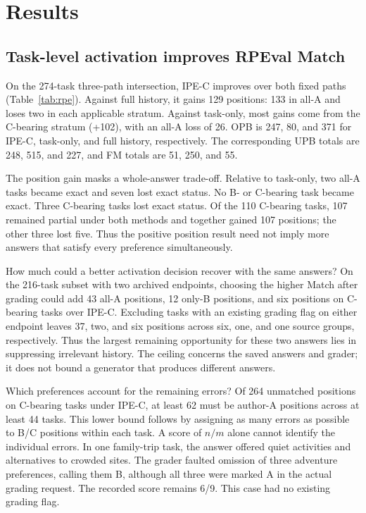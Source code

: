 \documentclass[11pt]{article}
\begin{document}
\section{Results}

\subsection{Task-level activation improves RPEval Match}

On the 274-task three-path intersection, IPE-C improves over both fixed paths (Table~\ref{tab:rpe}). Against full history, it gains 129 positions: 133 in all-A and loses two in each applicable stratum. Against task-only, most gains come from the C-bearing stratum (+102), with an all-A loss of 26. OPB is 247, 80, and 371 for IPE-C, task-only, and full history, respectively. The corresponding UPB totals are 248, 515, and 227, and FM totals are 51, 250, and 55.

The position gain masks a whole-answer trade-off. Relative to task-only, two all-A tasks became exact and seven lost exact status. No B- or C-bearing task became exact. Three C-bearing tasks lost exact status. Of the 110 C-bearing tasks, 107 remained partial under both methods and together gained 107 positions; the other three lost five. Thus the positive position result need not imply more answers that satisfy every preference simultaneously.

How much could a better activation decision recover with the same answers? On the 216-task subset with two archived endpoints, choosing the higher Match after grading could add 43 all-A positions, 12 only-B positions, and six positions on C-bearing tasks over IPE-C. Excluding tasks with an existing grading flag on either endpoint leaves 37, two, and six positions across six, one, and one source groups, respectively. Thus the largest remaining opportunity for these two answers lies in suppressing irrelevant history. The ceiling concerns the saved answers and grader; it does not bound a generator that produces different answers.

Which preferences account for the remaining errors? Of 264 unmatched positions on C-bearing tasks under IPE-C, at least 62 must be author-A positions across at least 44 tasks. This lower bound follows by assigning as many errors as possible to B/C positions within each task. A score of $n/m$ alone cannot identify the individual errors. In one family-trip task, the answer offered quiet activities and alternatives to crowded sites. The grader faulted omission of three adventure preferences, calling them B, although all three were marked A in the actual grading request. The recorded score remains 6/9. This case had no existing grading flag.
\end{document}
